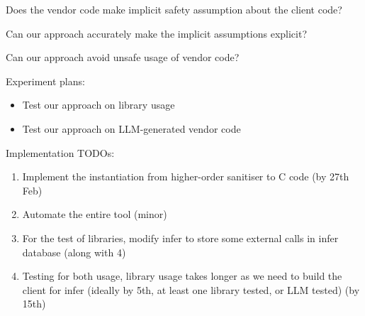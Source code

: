 
 Does the vendor code make implicit safety assumption about the client code?

 Can our approach accurately make the implicit assumptions explicit?

 Can our approach avoid unsafe usage of vendor code?

Experiment plans:
\begin{itemize}
\item Test our approach on library usage

\item Test our approach on LLM-generated vendor code
\end{itemize}
Implementation TODOs:

\begin{enumerate}
\item  Implement the instantiation from higher-order sanitiser to C code (by 27th Feb)

\item  Automate the entire tool (minor)

\item  For the test of libraries, modify infer to store some external calls in infer database (along with 4)

\item  Testing for both usage, library usage takes longer as we need to build the client for infer (ideally by 5th, at least one library tested, or LLM tested) (by 15th)

\end{enumerate}